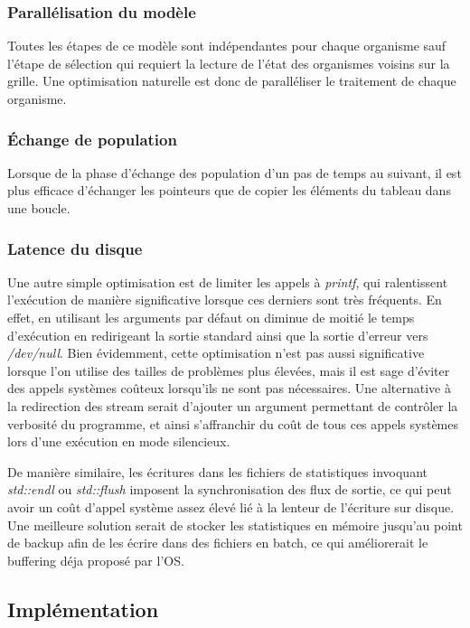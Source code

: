 \documentclass[a4paper, 10pt, twoside]{article}
\begin{document}
\subsubsection*{Parallélisation du modèle}

Toutes les étapes de ce modèle sont indépendantes pour chaque organisme sauf l'étape de sélection qui requiert la lecture de l'état des organismes voisins sur la grille. Une optimisation naturelle est donc de paralléliser le traitement de chaque organisme\label{parallel/orga}.

\subsubsection*{Échange de population}

Lorsque de la phase d'échange des population d'un pas de temps au suivant, il est plus efficace d'échanger les pointeurs que de copier les éléments du tableau dans une boucle.

\subsubsection*{Latence du disque}

Une autre simple optimisation est de limiter les appels à \textit{printf}, qui ralentissent l'exécution de manière significative lorsque ces derniers sont très fréquents. En effet, en utilisant les arguments par défaut on diminue de moitié le temps d'exécution en redirigeant la sortie standard ainsi que la sortie d'erreur vers \textit{/dev/null}. Bien évidemment, cette optimisation n'est pas aussi significative lorsque l'on utilise des tailles de problèmes plus élevées, mais il est sage d'éviter des appels systèmes coûteux lorsqu'ils ne sont pas nécessaires. Une alternative à la redirection des stream serait d'ajouter un argument permettant de contrôler la verbosité du programme, et ainsi s'affranchir du coût de tous ces appels systèmes lors d'une exécution en mode silencieux.

De manière similaire, les écritures dans les fichiers de statistiques invoquant \textit{std::endl} ou \textit{std::flush} imposent la synchronisation des flux de sortie, ce qui peut avoir un coût d'appel système assez élevé lié à la lenteur de l'écriture sur disque. Une meilleure solution serait de stocker les statistiques en mémoire jusqu'au point de backup afin de les écrire dans des fichiers en batch, ce qui améliorerait le buffering déja proposé par l'OS.

\subsection{Implémentation}
\end{document}
